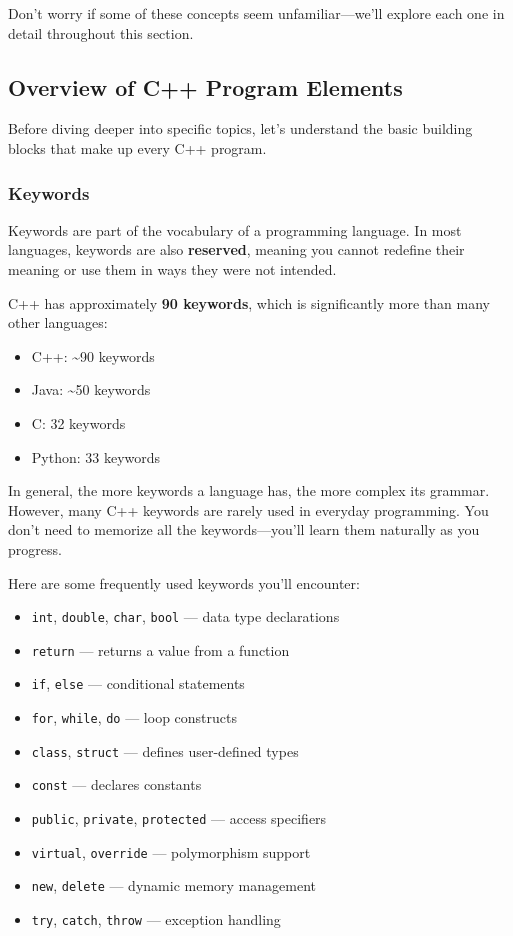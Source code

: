 \begin{remark}
	Don't worry if some of these concepts seem unfamiliar—we'll explore each one in detail throughout this section.
\end{remark}

\subsection{Overview of C++ Program Elements}

Before diving deeper into specific topics, let's understand the basic building blocks that make up every C++ program.

\subsubsection{Keywords}

Keywords are part of the vocabulary of a programming language. In most languages, keywords are also \textbf{reserved}, meaning you cannot redefine their meaning or use them in ways they were not intended.

C++ has approximately \textbf{90 keywords}, which is significantly more than many other languages:
\begin{itemize}
	\item C++: \textasciitilde{}90 keywords
	\item Java: \textasciitilde{}50 keywords
	\item C\@: 32 keywords
	\item Python: 33 keywords
\end{itemize}

In general, the more keywords a language has, the more complex its grammar. However, many C++ keywords are rarely used in everyday programming. You don't need to memorize all the keywords—you'll learn them naturally as you progress.

\begin{example}{\leavevmode}
	Here are some frequently used keywords you'll encounter:
	\begin{itemize}
		\item \texttt{int}, \texttt{double}, \texttt{char}, \texttt{bool} — data type declarations
		\item \texttt{return} — returns a value from a function
		\item \texttt{if}, \texttt{else} — conditional statements
		\item \texttt{for}, \texttt{while}, \texttt{do} — loop constructs
		\item \texttt{class}, \texttt{struct} — defines user-defined types
		\item \texttt{const} — declares constants
		\item \texttt{public}, \texttt{private}, \texttt{protected} — access specifiers
		\item \texttt{virtual}, \texttt{override} — polymorphism support
		\item \texttt{new}, \texttt{delete} — dynamic memory management
		\item \texttt{try}, \texttt{catch}, \texttt{throw} — exception handling
	\end{itemize}
\end{example}

